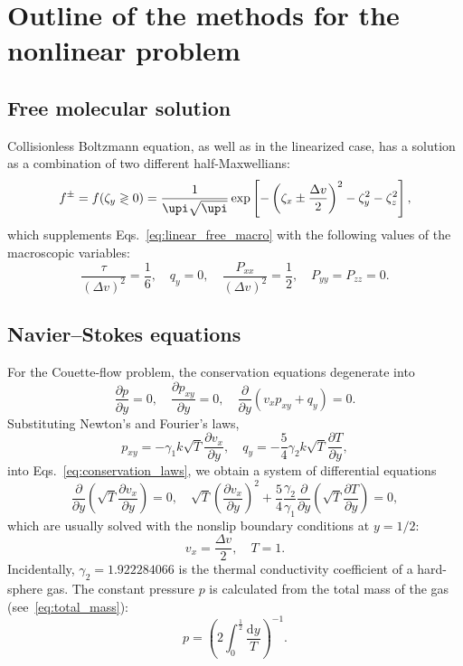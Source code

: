\documentclass[final]{jfm} %
\newcommand{\dd}{\mathrm{d}}
\newcommand{\pder}[2][]{\frac{\partial#1}{\partial#2}}
\begin{document}
\section{Outline of the methods for the nonlinear problem}

\subsection{Free molecular solution}

Collisionless Boltzmann equation, as well as in the linearized case,
has a solution as a combination of two different half-Maxwellians:
\begin{equation}\label{eq:free_solution}
    f^\pm = f(\zeta_y \gtrless 0) =
        \frac1{\upi\sqrt{\upi}} \exp\left[-\left(\zeta_x\pm\frac{\Delta{v}}2\right)^2 - \zeta_y^2 - \zeta_z^2\right],
\end{equation}
which supplements Eqs.~\eqref{eq:linear_free_macro} with the following values of the macroscopic variables:
\begin{equation}\label{eq:free_macro}
    \frac{\tau}{(\Delta{v})^2} = \frac16, \quad q_y = 0, \quad
    \frac{P_{xx}}{(\Delta{v})^2} = \frac12, \quad P_{yy} = P_{zz} = 0.
\end{equation}

\subsection{Navier--Stokes equations}\label{sec:Navier-Stokes}

For the Couette-flow problem, the conservation equations degenerate into
\begin{equation}\label{eq:conservation_laws}
    \pder[p]{y} = 0, \quad \pder[p_{xy}]{y} = 0, \quad \pder{y}(v_x p_{xy} + q_y) = 0.
\end{equation}
Substituting Newton's and Fourier's laws,
\begin{equation}\label{eq:Newton-Fourier}
    p_{xy} = -\gamma_1 k\sqrt{T}\pder[v_x]{y}, \quad q_y = -\frac54\gamma_2 k\sqrt{T}\pder[T]{y},
\end{equation}
into Eqs.~\eqref{eq:conservation_laws}, we obtain a system of differential equations
\begin{equation}\label{eq:Navier-Stokes}
    \pder{y}\left(\sqrt{T}\pder[v_x]{y}\right) = 0, \quad
    \sqrt{T}\left(\pder[v_x]{y}\right)^2 + \frac54\frac{\gamma_2}{\gamma_1}\pder{y}\left(\sqrt{T}\pder[T]{y}\right) = 0,
\end{equation}
which are usually solved with the nonslip boundary conditions at \(y=1/2\):
\begin{equation}\label{eq:nonslip_bc}
    v_x = \frac{\Delta{v}}2, \quad T = 1.
\end{equation}
Incidentally, \(\gamma_2 = 1.922284066\) is the thermal conductivity coefficient of a hard-sphere gas.
The constant pressure \(p\) is calculated from the total mass of the gas (see~\eqref{eq:total_mass}):
\begin{equation}\label{eq:constant_pressure}
    p = \left( 2\int_{0}^\frac12\frac{\dd{y}}{T} \right)^{-1}.
\end{equation}
\end{document}
